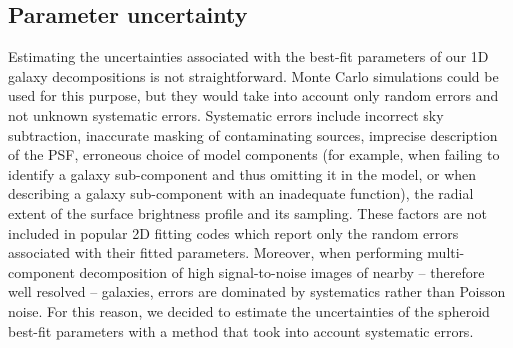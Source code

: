 \documentclass[preprint2]{emulateapj}
\begin{document}
\subsection{Parameter uncertainty}
\label{sec:err}
Estimating the uncertainties associated with the best-fit parameters of our 1D galaxy decompositions is not straightforward.
Monte Carlo simulations could be used for this purpose, 
but they would take into account only random errors and not unknown systematic errors.
Systematic errors include incorrect sky subtraction, 
inaccurate masking of contaminating sources, 
imprecise description of the PSF, 
erroneous choice of model components 
(for example, when failing to identify a galaxy sub-component and thus omitting it in the model, 
or when describing a galaxy sub-component with an inadequate function),
the radial extent of the surface brightness profile and its sampling.
These factors are not included in popular 2D fitting codes which report only the random errors associated with their fitted parameters.  
Moreover, when performing multi-component decomposition of high signal-to-noise images of nearby -- therefore well resolved -- galaxies, 
errors are dominated by systematics rather than Poisson noise.
For this reason, we decided to estimate the uncertainties of the spheroid best-fit parameters 
with a method that took into account systematic errors. 
\end{document}

